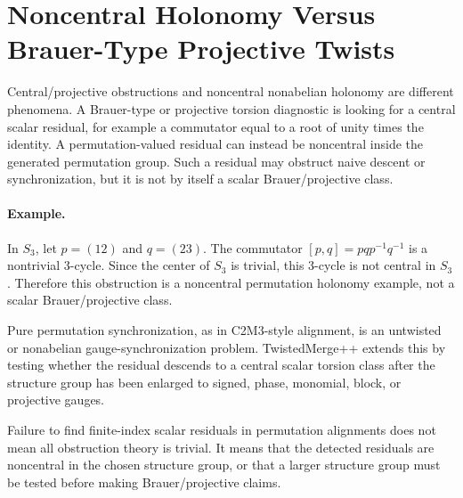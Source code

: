 \section*{Noncentral Holonomy Versus Brauer-Type Projective Twists}

Central/projective obstructions and noncentral nonabelian holonomy are different
phenomena.  A Brauer-type or projective torsion diagnostic is looking for a
central scalar residual, for example a commutator equal to a root of unity times
the identity.  A permutation-valued residual can instead be noncentral inside
the generated permutation group.  Such a residual may obstruct naive descent or
synchronization, but it is not by itself a scalar Brauer/projective class.

\paragraph{Example.}
In \(S_3\), let \(p=(12)\) and \(q=(23)\).  The commutator
\([p,q]=p q p^{-1}q^{-1}\) is a nontrivial 3-cycle.  Since the center of
\(S_3\) is trivial, this 3-cycle is not central in \(S_3\).  Therefore this
obstruction is a noncentral permutation holonomy example, not a scalar
Brauer/projective class.

Pure permutation synchronization, as in C2M3-style alignment, is an untwisted
or nonabelian gauge-synchronization problem.  TwistedMerge++ extends this by
testing whether the residual descends to a central scalar torsion class after
the structure group has been enlarged to signed, phase, monomial, block, or
projective gauges.

Failure to find finite-index scalar residuals in permutation alignments does
not mean all obstruction theory is trivial.  It means that the detected
residuals are noncentral in the chosen structure group, or that a larger
structure group must be tested before making Brauer/projective claims.
